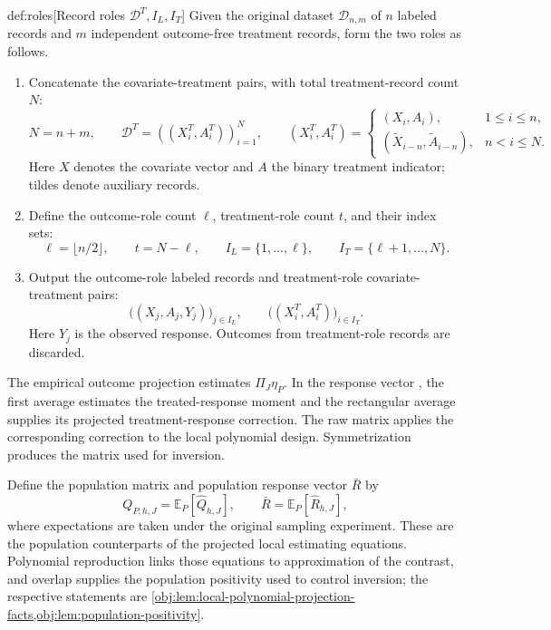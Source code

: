 \begin{algorithmv}{def:roles}[Record roles \(\mathcal D^T,I_L,I_T\)]
Given the original dataset \(\mathcal D_{n,m}\) of \(n\) labeled records and \(m\) independent outcome-free treatment records, form the two roles as follows.
\begin{enumerate}
\item Concatenate the covariate-treatment pairs, with total treatment-record count \(N\):
\[
N=n+m,\qquad
\mathcal D^T=((X_i^T,A_i^T))_{i=1}^N,
\qquad
(X_i^T,A_i^T)=
\begin{cases}
(X_i,A_i),&1\le i\le n,\\
(\widetilde X_{i-n},\widetilde A_{i-n}),&n<i\le N.
\end{cases}
\]
Here \(X\) denotes the covariate vector and \(A\) the binary treatment indicator; tildes denote auxiliary records.
\item Define the outcome-role count \(\ell\), treatment-role count \(t\), and their index sets:
\[
\ell=\lfloor n/2\rfloor,\qquad
t=N-\ell,\qquad
I_L=\{1,\ldots,\ell\},\qquad
I_T=\{\ell+1,\ldots,N\}.
\]
\item Output the outcome-role labeled records and treatment-role covariate-treatment pairs:
\[
\bigl((X_j,A_j,Y_j)\bigr)_{j\in I_L},
\qquad
\bigl((X_i^T,A_i^T)\bigr)_{i\in I_T}.
\]
Here \(Y_j\) is the observed response. Outcomes from treatment-role records are discarded.
\end{enumerate}
\end{algorithmv}

The empirical outcome projection  estimates \(\Pi_J\eta_P\). In the response vector , the first average estimates the treated-response moment and the rectangular average supplies its projected treatment-response correction. The raw matrix  applies the corresponding correction to the local polynomial design. Symmetrization produces the matrix  used for inversion.

Define the population matrix  and population response vector \(\bar R\) by
\[
Q_{P,h,J}=\mathbb E_P[\widehat Q_{h,J}],
\qquad
\bar R=\mathbb E_P[\widehat R_{h,J}],
\]
where expectations are taken under the original sampling experiment. These are the population counterparts of the projected local estimating equations. Polynomial reproduction links those equations to approximation of the contrast, and overlap supplies the population positivity used to control inversion; the respective statements are \cref{obj:lem:local-polynomial-projection-facts,obj:lem:population-positivity}.

